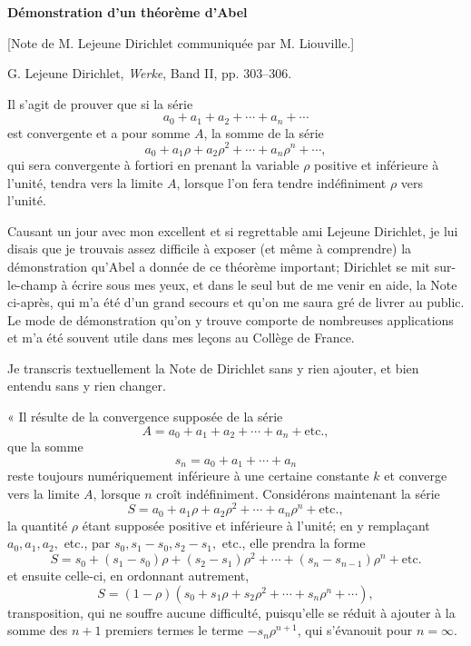 \documentclass[11pt]{article}
\begin{document}
\begin{center}
{\Large\bfseries Démonstration d'un théorème d'Abel\par}
\vspace{0.35em}
{\normalsize [Note de M. Lejeune Dirichlet communiquée par M. Liouville.]\par}
\vspace{0.8em}
{\small G. Lejeune Dirichlet, \emph{Werke}, Band II, pp. 303--306.}
\end{center}


Il s'agit de prouver que si la série
\[
a_0+a_1+a_2+\cdots+a_n+\cdots
\]
est convergente et a pour somme \(A\), la somme de la série
\[
a_0+a_1\rho+a_2\rho^2+\cdots+a_n\rho^n+\cdots,
\]
qui sera convergente à fortiori en prenant la variable \(\rho\) positive et inférieure à l'unité, tendra vers la limite \(A\), lorsque l'on fera tendre indéfiniment \(\rho\) vers l'unité.

Causant un jour avec mon excellent et si regrettable ami Lejeune Dirichlet, je lui disais que je trouvais assez difficile à exposer (et même à comprendre) la démonstration qu'Abel a donnée de ce théorème important; Dirichlet se mit sur-le-champ à écrire sous mes yeux, et dans le seul but de me venir en aide, la Note ci-après, qui m'a été d'un grand secours et qu'on me saura gré de livrer au public. Le mode de démonstration qu'on y trouve comporte de nombreuses applications et m'a été souvent utile dans mes leçons au Collège de France.

Je transcris textuellement la Note de Dirichlet sans y rien ajouter, et bien entendu sans y rien changer.

« Il résulte de la convergence supposée de la série
\[
A=a_0+a_1+a_2+\cdots+a_n+\text{etc.},
\]
que la somme
\[
s_n=a_0+a_1+\cdots+a_n
\]
reste toujours numériquement inférieure à une certaine constante \(k\) et converge vers la limite \(A\), lorsque \(n\) croît indéfiniment. Considérons maintenant la série
\[
S=a_0+a_1\rho+a_2\rho^2+\cdots+a_n\rho^n+\text{etc.},
\]
la quantité \(\rho\) étant supposée positive et inférieure à l'unité; en y remplaçant \(a_0,a_1,a_2,\) etc., par \(s_0, s_1-s_0, s_2-s_1,\) etc., elle prendra la forme
\[
S=s_0+(s_1-s_0)\rho+(s_2-s_1)\rho^2+\cdots+(s_n-s_{n-1})\rho^n+\text{etc.}
\]
et ensuite celle-ci, en ordonnant autrement,
\[
S=(1-\rho)(s_0+s_1\rho+s_2\rho^2+\cdots+s_n\rho^n+\cdots),
\]
transposition, qui ne souffre aucune difficulté, puisqu'elle se réduit à ajouter à la somme des \(n+1\) premiers termes le terme \(-s_n\rho^{n+1}\), qui s'évanouit pour \(n=\infty\).
\end{document}
